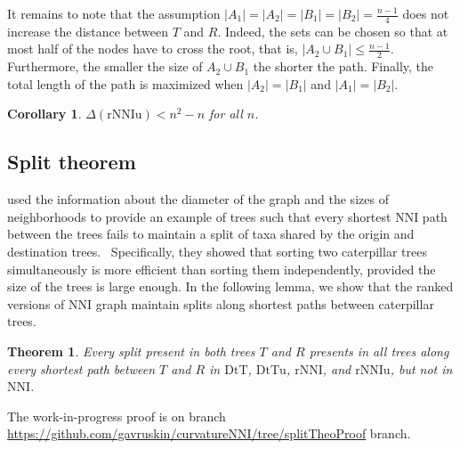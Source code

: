 \documentclass{amsart}
\newtheorem{corollary}[lemma]{Corollary}
\newtheorem{theorem}[lemma]{Theorem}
\theoremstyle{definition}
\newcommand{\nni}{\mathrm{NNI}}
\newcommand{\rnni}{\mathrm{rNNI}}
\newcommand{\rnniu}{\mathrm{rNNIu}}
\newcommand{\dtt}{\mathrm{DtT}}
\newcommand{\dttu}{\mathrm{DtTu}}
\begin{document}
It remains to note that the assumption $|A_1| = |A_2| = |B_1| = |B_2| = \frac{n-1}{4}$ does not increase the distance between $T$ and $R$.
Indeed, the sets can be chosen so that at most half of the nodes have to cross the root, that is, $|A_2 \cup B_1| \le \frac{n-1}{2}$.
Furthermore, the smaller the size of $A_2 \cup B_1$ the shorter the path.
Finally, the total length of the path is maximized when $|A_2| = |B_1|$ and $|A_1| = |B_2|$.
\endproof

\begin{corollary}\label{diameterUpperBoundCoro}
$\Delta(\rnniu) < n^2 - n$ for all $n$.
\end{corollary}


\subsection{Split theorem}

\textcite{li1996some} used the information about the diameter of the graph and the sizes of neighborhoods to provide an example of trees such that every shortest $\nni$ path between the trees fails to maintain a split of taxa shared by the origin and destination trees.~
Specifically, they showed that sorting two caterpillar trees simultaneously is more efficient than sorting them independently, provided the size of the trees is large enough.
In the following lemma, we show that the ranked versions of $\nni$ graph maintain splits along shortest paths between caterpillar trees.

\begin{theorem}\label{splitTheo}
 Every split present in both trees $T$ and $R$ presents in all trees along every shortest path between $T$ and $R$ in $\dtt$, $\dttu$, $\rnni$, and $\rnniu$, but not in $\nni$.
 \end{theorem}

\proof
The work-in-progress proof is on branch
\url{https://github.com/gavruskin/curvatureNNI/tree/splitTheoProof} branch.
\end{document}
